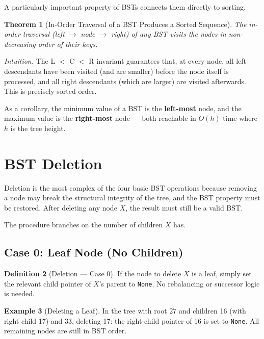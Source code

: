 \documentclass[11pt, a4paper, notitlepage]{report}
\newtheorem{theorem}{Theorem}[section]
\theoremstyle{definition}
\newtheorem{definition}[theorem]{Definition}
\theoremstyle{remark}
\theoremstyle{definition}
\newtheorem{example}[theorem]{Example}
\begin{document}
A particularly important property of BSTs connects them directly to sorting.

\begin{theorem}[In-Order Traversal of a BST Produces a Sorted Sequence]
\label{thm:bst-inorder-sorted}
The in-order traversal (left $\to$ node $\to$ right) of any BST visits the nodes in
non-decreasing order of their keys.
\end{theorem}

\textit{Intuition.}  The L $<$ C $<$ R invariant guarantees that, at every node, all left
descendants have been visited (and are smaller) before the node itself is processed, and all
right descendants (which are larger) are visited afterwards.  This is precisely sorted order.

As a corollary, the minimum value of a BST is the \textbf{left-most} node, and the maximum
value is the \textbf{right-most} node --- both reachable in $O(h)$ time where $h$ is the tree
height.

\section{BST Deletion}
\label{sec:bst-delete}

Deletion is the most complex of the four basic BST operations because removing a node may
break the structural integrity of the tree, and the BST property must be restored.  After
deleting any node $X$, the result must still be a valid BST.

The procedure branches on the number of children $X$ has.

\subsection{Case 0: Leaf Node (No Children)}
\label{subsec:delete-case0}

\begin{definition}[Deletion --- Case 0]
If the node to delete $X$ is a leaf, simply set the relevant child pointer of $X$'s parent to
\texttt{None}.  No rebalancing or successor logic is needed.
\end{definition}

\begin{example}[Deleting a Leaf]
\label{ex:delete-leaf}
In the tree with root 27 and children 16 (with right child 17) and 33, deleting 17:
the right-child pointer of 16 is set to \texttt{None}.  All remaining nodes are still in BST
order.
\end{example}
\end{document}

